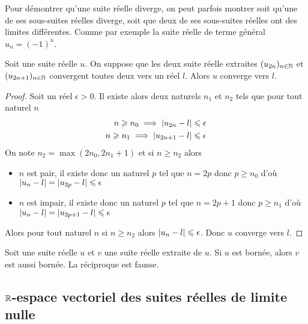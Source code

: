 Pour démontrer qu'une suite réelle diverge, on peut parfois montrer soit qu'une 
de ses sous-suites réelles diverge, soit que deux de ses sous-suites réelles ont 
des limites différentes. Comme par exemple la suite réelle de terme général 
\(u_n = (-1)^n\).
\begin{prop}
    Soit une suite réelle \(u\). On suppose que les deux suite réelle extraites 
    \((u_{2n})_{n \in \mathbb{N}}\) et \((u_{2n+1})_{n \in \mathbb{N}}\) convergent toutes deux 
    vers un réel \(l\). Alors \(u\) converge vers \(l\).
\end{prop}
\begin{proof}
    Soit un réel \(\epsilon>0\). Il existe alors deux naturels \(n_1\) et \(n_2\) 
    tels que pour tout naturel \(n\)
    \begin{align}
        n \geqslant n_0 \implies \left\lvert u_{2n}-l\right\rvert \leqslant \epsilon \\  n \geqslant 
        n_1 \implies \left\lvert u_{2n+1}-l\right\rvert \leqslant \epsilon
    \end{align}
    On note \(n_2 = \max(2n_0,2n_1+1)\) et si \(n \geqslant n_2\) alors
    \begin{itemize}
        \item \(n\) est pair, il existe donc un naturel \(p\) tel que \(n = 2p\) 
            donc \(p\geqslant n_0\) d'où \(\left\lvert u_n-l\right\rvert = \left\lvert u_{2p}-l\right\rvert \leqslant 
            \epsilon\)
        \item \(n\) est impair, il existe donc un naturel \(p\) tel que \(n = 2p+1\) 
            donc \(p\geqslant n_1\) d'où \(\left\lvert u_n-l\right\rvert = \left\lvert u_{2p+1}-l\right\rvert \leqslant 
            \epsilon\)
    \end{itemize}
    Alors pour tout naturel \(n\) si \(n \geqslant n_2\) alors \(\left\lvert u_n-l\right\rvert 
    \leqslant \epsilon\). Donc \(u\) converge vers \(l\).
\end{proof}
\begin{prop}
    Soit une suite réelle \(u\) et \(v\) une suite réelle extraite de \(u\). Si 
    \(u\) est bornée, alors \(v\) est aussi bornée. La réciproque est fausse.
\end{prop}

\subsection{\(\mathbb{R}\)-espace vectoriel des suites réelles de limite nulle}

